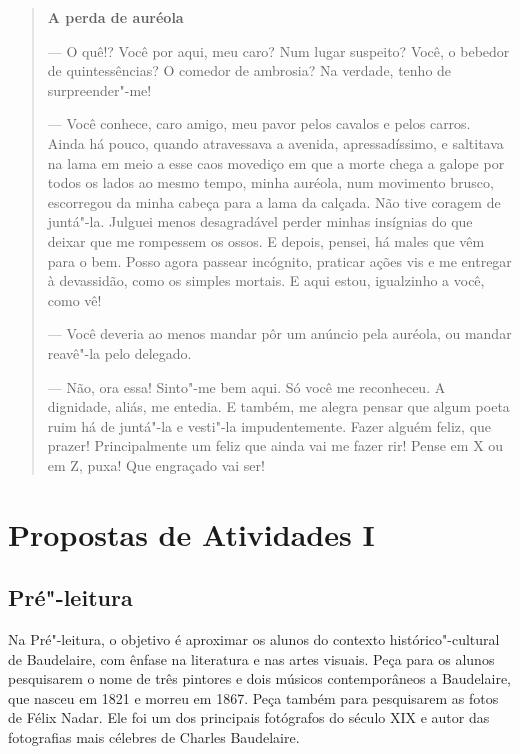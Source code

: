 \documentclass[12pt]{extarticle}
\begin{document}
\begin{quote}
{\centering\textbf{A perda de auréola}\par}

--- O quê!? Você por aqui, meu caro? Num lugar suspeito?
Você, o bebedor de quintessências? O comedor de ambrosia? Na
verdade, tenho de surpreender"-me!

--- Você conhece, caro amigo, meu pavor pelos cavalos e pelos carros. Ainda
há pouco, quando atravessava a avenida, apressadíssimo, e
saltitava na lama em meio a esse caos movediço em que a morte chega a
galope por todos os lados ao mesmo tempo, minha auréola, num movimento
brusco, escorregou da minha cabeça para a lama da calçada. Não tive
coragem de juntá"-la. Julguei menos desagradável perder minhas
insígnias do que deixar que me rompessem os ossos. E depois, pensei, há
males que vêm para o bem. Posso agora passear incógnito, praticar ações
vis e me entregar à devassidão, como os simples mortais. E 
aqui estou, igualzinho a você, como vê!

--- Você deveria ao menos mandar pôr um anúncio pela auréola, ou mandar
reavê"-la pelo delegado.

--- Não, ora essa! Sinto"-me bem aqui. Só você me reconheceu. A dignidade, aliás, me entedia. E também, me alegra pensar que algum poeta ruim
há de juntá"-la e vesti"-la impudentemente. Fazer alguém feliz, que
prazer! Principalmente um feliz que ainda vai me fazer rir! Pense em X ou em
Z, puxa! Que engraçado vai ser!

\end{quote}


\section{Propostas de Atividades I}

\subsection{Pré"-leitura}

Na Pré"-leitura, o objetivo é aproximar os alunos do contexto
histórico"-cultural de Baudelaire, com ênfase na literatura e nas artes
visuais. Peça para os alunos pesquisarem o nome de três pintores e 
dois músicos contemporâneos a Baudelaire, que nasceu em 1821 e 
morreu em 1867. Peça também para pesquisarem as fotos de Félix Nadar. Ele foi 
um dos principais fotógrafos do século XIX e autor das 
fotografias mais célebres de Charles Baudelaire.  
\end{document}
